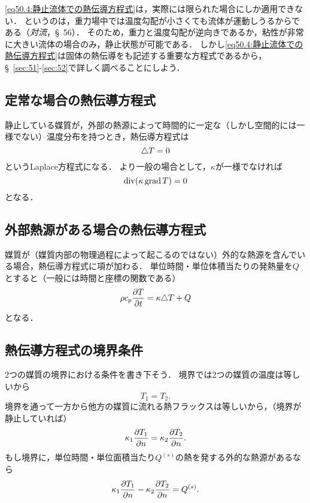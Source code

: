 \eqref{eq50.4:静止流体での熱伝導方程式}は，実際には限られた場合にしか適用できない．
というのは，重力場中では温度勾配が小さくても流体が運動しうるからである（\emph{対流}，\S~56）．
そのため，重力と温度勾配が逆向きであるか，粘性が非常に大きい流体の場合のみ，静止状態が可能である．
しかし\eqref{eq50.4:静止流体での熱伝導方程式}は固体の熱伝導をも記述する重要な方程式であるから，
\S~\ref{sec:51}-\ref{sec:52}で詳しく調べることにしよう．



\subsection*{定常な場合の熱伝導方程式}
静止している媒質が，外部の熱源によって時間的に一定な（しかし空間的には一様でない）温度分布を持つとき，熱伝導方程式は
\begin{equation}
    \triangle T = 0
\end{equation}
というLaplace方程式になる．
より一般の場合として，$\kappa$が一様でなければ
\begin{equation}
    \operatorname{div}(\kappa \operatorname{grad} T) = 0
\end{equation}
となる．




\subsection*{外部熱源がある場合の熱伝導方程式}
媒質が（媒質内部の物理過程によって起こるのではない）外的な熱源を含んでいる場合，熱伝導方程式に項が加わる．
単位時間・単位体積当たりの発熱量を$Q$とすると（一般には時間と座標の関数である）
\begin{equation}
    \rho c_p \pdv{T}{t} = \kappa \triangle T + Q
\end{equation}
となる．



\subsection*{熱伝導方程式の境界条件}
2つの媒質の境界における条件を書き下そう．
境界では2つの媒質の温度は等しいから
\begin{equation}
    T_1=T_2.
\end{equation}
境界を通って一方から他方の媒質に流れる熱フラックスは等しいから，（境界が静止していれば）
\begin{equation}
    \kappa_1 \pdv{T_1}{n} = \kappa_2 \pdv{T_2}{n} .
\end{equation}
もし境界に，単位時間・単位面積当たり$Q^{(s)}$の熱を発する外的な熱源があるなら
\begin{equation}
    \kappa_1 \pdv{T_1}{n} - \kappa_2 \pdv{T_2}{n} = Q^{(s)}.
\end{equation}

